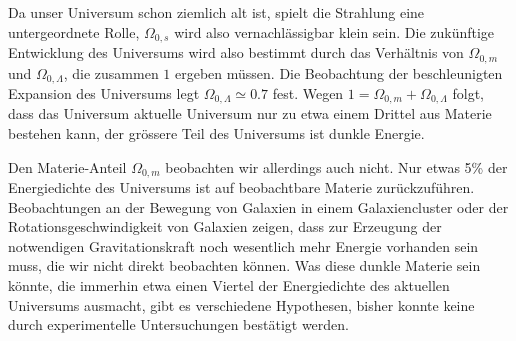 Da unser Universum schon ziemlich alt ist, spielt die Strahlung
eine untergeordnete Rolle, $\Omega_{0,s}$ wird also vernachlässigbar
klein sein. 
Die zukünftige Entwicklung des Universums wird also bestimmt durch
das Verhältnis von $\Omega_{0,m}$ und $\Omega_{0,\Lambda}$, die
zusammen $1$ ergeben müssen.
Die Beobachtung der beschleunigten Expansion des Universums 
legt $\Omega_{0,\Lambda}\simeq 0.7$ fest.
Wegen $1=\Omega_{0,m}+\Omega_{0,\Lambda}$ folgt, dass das
Universum aktuelle Universum nur zu etwa einem Drittel aus 
Materie bestehen kann, der grössere Teil des Universums ist
dunkle Energie.

Den Materie-Anteil $\Omega_{0,m}$ beobachten wir allerdings auch
nicht.
Nur etwas 5\% der Energiedichte des Universums ist auf beobachtbare
Materie zurückzuführen.
Beobachtungen an der Bewegung von Galaxien in einem Galaxiencluster
oder der Rotationsgeschwindigkeit von Galaxien zeigen, dass zur Erzeugung
der notwendigen Gravitationskraft noch wesentlich mehr Energie vorhanden
sein muss, die wir nicht direkt beobachten können.
Was diese dunkle Materie sein könnte, die immerhin etwa einen Viertel der
Energiedichte des aktuellen Universums ausmacht, gibt es verschiedene
Hypothesen, bisher konnte keine durch experimentelle Untersuchungen
bestätigt werden.




